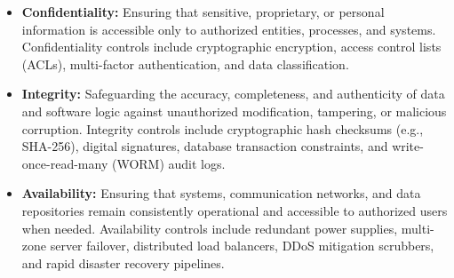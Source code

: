 \documentclass[11pt,a4paper]{article}
\begin{document}
\begin{itemize}
    \item \textbf{Confidentiality:} Ensuring that sensitive, proprietary, or personal information is accessible only to authorized entities, processes, and systems. Confidentiality controls include cryptographic encryption, access control lists (ACLs), multi-factor authentication, and data classification.
    \item \textbf{Integrity:} Safeguarding the accuracy, completeness, and authenticity of data and software logic against unauthorized modification, tampering, or malicious corruption. Integrity controls include cryptographic hash checksums (e.g., SHA-256), digital signatures, database transaction constraints, and write-once-read-many (WORM) audit logs.
    \item \textbf{Availability:} Ensuring that systems, communication networks, and data repositories remain consistently operational and accessible to authorized users when needed. Availability controls include redundant power supplies, multi-zone server failover, distributed load balancers, DDoS mitigation scrubbers, and rapid disaster recovery pipelines.
\end{itemize}
\end{document}
